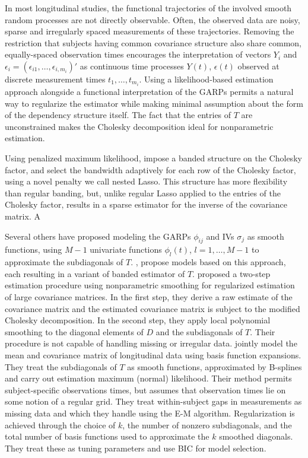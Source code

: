 In most longitudinal studies, the functional trajectories of the involved smooth random processes are not directly observable. Often, the observed data are noisy, sparse and irregularly spaced measurements of these trajectories. Removing the restriction that subjects having common covariance structure also share common, equally-spaced observation times encourages the interpretation of vectors $Y_i$ and $\epsilon_i = \left(\epsilon_{i1}, \dots, \epsilon_{i, m_i} \right)'$ as continuous time processes $Y\left(t\right)$, $\epsilon\left(t\right)$ observed at discrete measurement times $t_1,\dots, t_{m_i}$. Using a likelihood-based estimation approach alongside a functional interpretation of the GARPs permits a natural way to regularize the estimator while making minimal assumption about the form of the dependency structure itself. The fact that the entries of $T$ are unconstrained makes the Cholesky decomposition ideal for nonparametric estimation. 

\bigskip
Using penalized maximum likelihood, \citet{levina2008sparse} impose a banded structure on the Cholesky factor, and select the bandwidth adaptively for each row of the Cholesky factor, using a novel penalty we call nested Lasso.
This structure has more flexibility than regular banding, but, unlike regular Lasso applied to the entries of the Cholesky factor, results in a sparse estimator for the inverse of the covariance matrix. A
\bigskip

Several others have proposed modeling the GARPs $\phi_{ij}$ and IVs $\sigma_j$ as smooth functions, using $M-1$ univariate functions $\phi_l\left(t\right)$, $l = 1,\dots, M-1$ to approximate the subdiagonals of $T$. \citet{wu2003nonparametric}, \citet{huang2006covariance} propose models based on this approach, each resulting in a variant of banded estimator of $T$. \citet{wu2003nonparametric} proposed a two-step estimation procedure using nonparametric smoothing for regularized estimation of large covariance matrices.  In the first step, they derive a raw estimate of the covariance matrix and the estimated covariance matrix is subject to the modified Cholesky decomposition. In the second step, they apply local polynomial smoothing to the diagonal elements of $D$ and the subdiagonals of $T$. Their procedure is not capable of handling missing or irregular data. \citet{huang2007estimation} jointly model the mean and covariance matrix of longitudinal data using basis function expansions. They treat the subdiagonals of $T$ as smooth functions, approximated by B-splines and carry out estimation maximum (normal) likelihood. Their method permits subject-specific observations times, but assumes that observation times lie on some notion of a regular grid. They treat within-subject gaps in measurements as missing data and which they handle using the E-M algorithm. Regularization is achieved through the choice of $k$, the number of nonzero subdiagonals, and the total number of basis functions used to approximate the $k$ smoothed diagonals. They treat these as tuning parameters and use BIC for model selection. 

